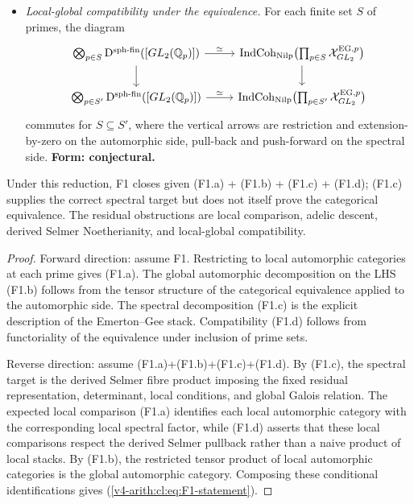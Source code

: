\begin{theorem}[F1 reduction]
\begin{itemize}
\begin{equation}
\end{equation}
with \(\mathcal{X}^{\mathcal{L}_{v}}_{v}\) the prescribed local
condition inside the full Weil/\((\varphi,\Gamma)\) local parameter
stack. This derived fibre product imposes the global Galois
relation and Selmer conditions; it is not a product or colimit of
local Emerton--Gee stacks.
\textbf{Form: definitional here; derived and Noetherian
properties are conditional/conditional on the local deformation
conditions and the chosen Selmer problem.}
\item[\textbf{(F1.d)}] \emph{Local-global compatibility under the
equivalence.} For each finite set \(S\) of primes, the diagram
\begin{equation}
\begin{tikzcd}
\bigotimes_{p\in S}\mathrm{D}^{\mathrm{sph\text{-}fin}}([GL_{2}(\mathbb{Q}_{p})]) \ar[r, "\simeq"] \ar[d] & \mathrm{IndCoh}_{\mathrm{Nilp}}\bigl(\prod_{p\in S}\mathcal{X}^{\mathrm{EG},p}_{GL_{2}}\bigr) \ar[d] \\
\bigotimes_{p\in S'}\mathrm{D}^{\mathrm{sph\text{-}fin}}([GL_{2}(\mathbb{Q}_{p})]) \ar[r, "\simeq"] & \mathrm{IndCoh}_{\mathrm{Nilp}}\bigl(\prod_{p\in S'}\mathcal{X}^{\mathrm{EG},p}_{GL_{2}}\bigr)
\end{tikzcd}
\end{equation}
commutes for \(S\subseteq S'\), where the vertical arrows are
restriction and extension-by-zero on the automorphic side, pull-back
and push-forward on the spectral side.
\textbf{Form: conjectural.}
\end{itemize}
Under this reduction, F1 closes given (F1.a) + (F1.b) + (F1.c) +
(F1.d); (F1.c) supplies the correct spectral target but does not
itself prove the categorical equivalence. The residual obstructions
are local comparison, adelic descent, derived Selmer Noetherianity,
and local-global compatibility.
\end{theorem}

\begin{proof}
Forward direction: assume F1. Restricting to local automorphic
categories at each prime gives (F1.a). The
global automorphic decomposition on the LHS (F1.b) follows from
the tensor structure of the categorical equivalence applied to
the automorphic side. The spectral decomposition (F1.c) is the
explicit description of the Emerton--Gee stack. Compatibility
(F1.d) follows from functoriality of the equivalence under
inclusion of prime sets.

Reverse direction: assume (F1.a)+(F1.b)+(F1.c)+(F1.d). By (F1.c),
the spectral target is the derived Selmer fibre product imposing
the fixed residual representation, determinant, local conditions,
and global Galois relation. The expected local comparison (F1.a)
identifies each local automorphic category with the corresponding
local spectral factor, while (F1.d) asserts that these local
comparisons respect the derived Selmer pullback rather than a
naive product of local stacks. By (F1.b), the restricted tensor
product of local automorphic categories is the global automorphic
category. Composing these conditional identifications gives
(\ref{v4-arith:cl:eq:F1-statement}).
\end{proof}

